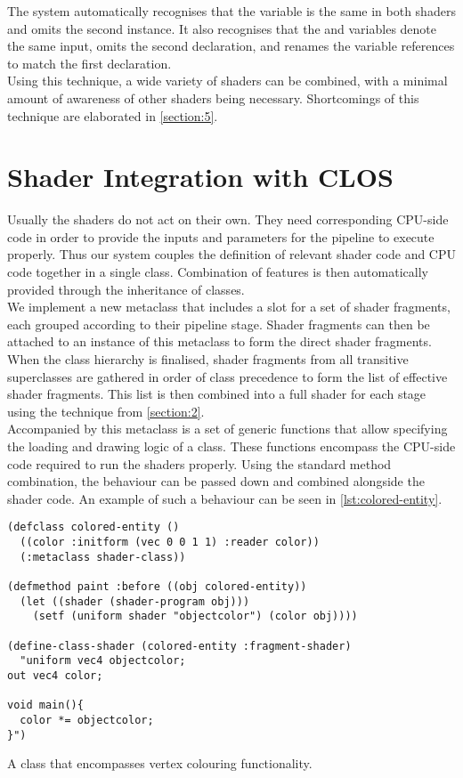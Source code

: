 \documentclass{sig-alternate}
\begin{document}
The system automatically recognises that the  variable is the same in both shaders and omits the second instance. It also recognises that the  and  variables denote the same input, omits the second declaration, and renames the variable references to match the first declaration. \\

Using this technique, a wide variety of shaders can be combined, with a minimal amount of awareness of other shaders being necessary. Shortcomings of this technique are elaborated in \autoref{section:5}.

\section{Shader Integration with CLOS}\label{section:4}
Usually the shaders do not act on their own. They need corresponding CPU-side code in order to provide the inputs and parameters for the pipeline to execute properly. Thus our system couples the definition of relevant shader code and CPU code together in a single class. Combination of features is then automatically provided through the inheritance of classes. \\

We implement a new metaclass that includes a slot for a set of shader fragments, each grouped according to their pipeline stage. Shader fragments can then be attached to an instance of this metaclass to form the direct shader fragments. When the class hierarchy is finalised, shader fragments from all transitive superclasses are gathered in order of class precedence to form the list of effective shader fragments. This list is then combined into a full shader for each stage using the technique from \autoref{section:2}. \\

Accompanied by this metaclass is a set of generic functions that allow specifying the loading and drawing logic of a class. These functions encompass the CPU-side code required to run the shaders properly. Using the standard method combination, the behaviour can be passed down and combined alongside the shader code. An example of such a behaviour can be seen in \autoref{lst:colored-entity}.\\

\begin{listing}[h]
\begin{verbatim}
(defclass colored-entity ()
  ((color :initform (vec 0 0 1 1) :reader color))
  (:metaclass shader-class))

(defmethod paint :before ((obj colored-entity))
  (let ((shader (shader-program obj)))
    (setf (uniform shader "objectcolor") (color obj))))

(define-class-shader (colored-entity :fragment-shader)
  "uniform vec4 objectcolor;
out vec4 color;

void main(){
  color *= objectcolor;
}")
\end{verbatim}
\caption{A  class that encompasses vertex colouring functionality.}
\label{lst:colored-entity}
\end{listing}
\end{document}
